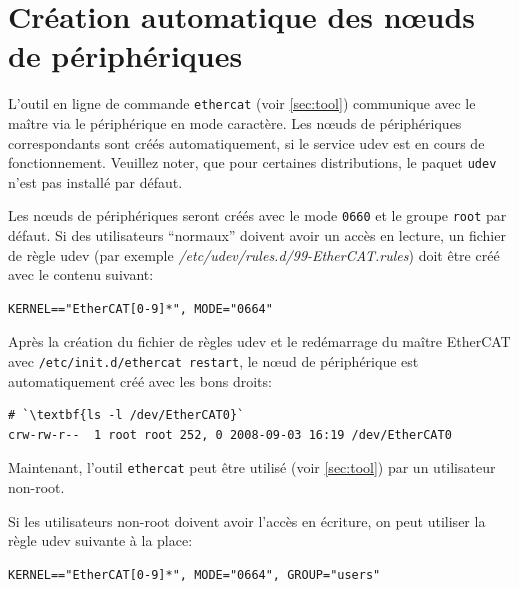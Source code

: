 \documentclass[a4paper,12pt,BCOR6mm,bibtotoc,idxtotoc]{scrbook}
\begin{document}
\section{Cr\'eation automatique des n\oe{}uds de p\'eriph\'eriques}
\label{sec:autonode}

L'outil en ligne de commande \lstinline+ethercat+ (voir
\autoref{sec:tool}) communique avec le ma\^itre via le
p\'eriph\'erique en mode caract\`ere.  Les n\oe{}uds de
p\'eriph\'eriques correspondants sont cr\'e\'es automatiquement, si le
service udev est en cours de fonctionnement.  Veuillez noter, que pour
certaines distributions, le paquet \lstinline+udev+ n'est pas
install\'e par d\'efaut.

Les n\oe{}uds de p\'eriph\'eriques seront cr\'e\'es avec le mode
\lstinline+0660+ et le groupe \lstinline+root+ par d\'efaut. Si des
utilisateurs ``normaux'' doivent avoir un acc\`es en lecture, un
fichier de r\`egle udev (par exemple
\textit{/etc/udev/rules.d/99-EtherCAT.rules}) doit \^etre cr\'e\'e
avec le contenu suivant:


\begin{lstlisting}
KERNEL=="EtherCAT[0-9]*", MODE="0664"
\end{lstlisting}

Apr\`es la cr\'eation du fichier de r\`egles udev et le red\'emarrage
du ma\^itre EtherCAT avec
\lstinline[breaklines=true]+/etc/init.d/ethercat restart+, le n\oe{}ud
de p\'eriph\'erique est automatiquement cr\'e\'e avec les bons droits:

\begin{lstlisting}
# `\textbf{ls -l /dev/EtherCAT0}`
crw-rw-r--  1 root root 252, 0 2008-09-03 16:19 /dev/EtherCAT0
\end{lstlisting}

Maintenant, l'outil \lstinline+ethercat+ peut \^etre utilis\'e (voir
\autoref{sec:tool}) par un utilisateur non-root.

Si les utilisateurs non-root doivent avoir l'acc\`es en \'ecriture, on
peut utiliser la r\`egle udev suivante \`a la place:

\begin{lstlisting}
KERNEL=="EtherCAT[0-9]*", MODE="0664", GROUP="users"
\end{lstlisting}

\end{document}
